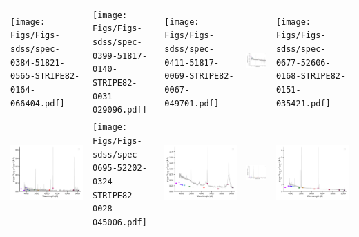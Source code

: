 \begin{center}
\begin{longtable}{l l l l l }
    \texttt{[image: Figs/Figs-sdss/spec-0384-51821-0565-STRIPE82-0164-066404.pdf]} & \texttt{[image: Figs/Figs-sdss/spec-0399-51817-0140-STRIPE82-0031-029096.pdf]} & \texttt{[image: Figs/Figs-sdss/spec-0411-51817-0069-STRIPE82-0067-049701.pdf]} & \includegraphics[width=0.19\linewidth, clip]{Figs/Figs-sdss/spec-0515-52051-0011-SPLUS-n02n22-059209.pdf} & \texttt{[image: Figs/Figs-sdss/spec-0677-52606-0168-STRIPE82-0151-035421.pdf]} \\
    \includegraphics[width=0.19\linewidth, clip]{Figs/Figs-sdss/spec-0686-52519-0104-STRIPE82-0005-024320.pdf} & \texttt{[image: Figs/Figs-sdss/spec-0695-52202-0324-STRIPE82-0028-045006.pdf]} & \includegraphics[width=0.19\linewidth, clip]{Figs/Figs-sdss/spec-0518-52282-0022-SPLUS-n02n26-033149.pdf} & \includegraphics[width=0.19\linewidth, clip]{Figs/Figs-sdss/spec-0519-52283-0278-SPLUS-n02n26-032045.pdf} & \includegraphics[width=0.19\linewidth, clip]{Figs/Figs-sdss/spec-0519-52283-0291-SPLUS-n02n26-039812.pdf} \\

\end{longtable}
\end{center}
